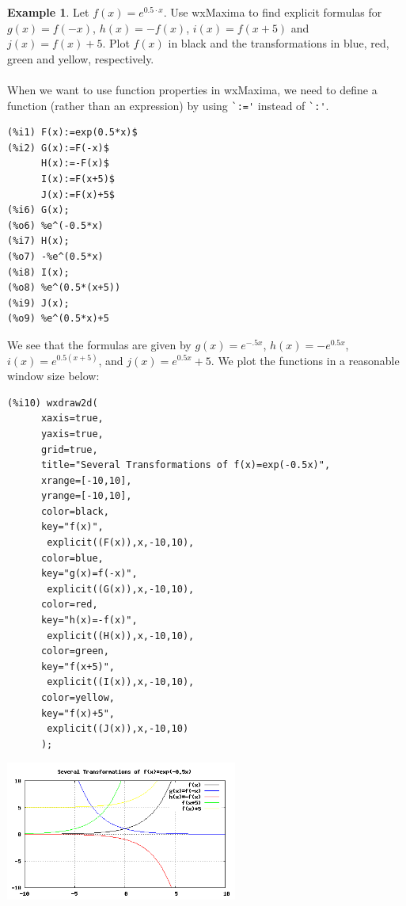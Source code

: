 \documentclass[10.5pt,twoside]{report}
\theoremstyle{definition}
\newtheorem{exmp}{Example}[section]
\begin{document}
\begin{exmp}
Let $f(x)=e^{0.5\cdot x}$.  Use wxMaxima to find explicit formulas for $g(x)=f(-x)$, $h(x)=-f(x)$, $i(x)=f(x+5)$ and $j(x)=f(x)+5$.  Plot $f(x)$ in black and the transformations in blue, red, green and yellow, respectively.\\
${}$\\

When we want to use function properties in wxMaxima, we need to define a function (rather than an expression) by using \verb|`:='| instead of \verb|`:'|.\\

\begin{verbatim}
(%i1) F(x):=exp(0.5*x)$
(%i2) G(x):=F(-x)$
      H(x):=-F(x)$
      I(x):=F(x+5)$
      J(x):=F(x)+5$
(%i6) G(x);
(%o6) %e^(-0.5*x)
(%i7) H(x);
(%o7) -%e^(0.5*x)
(%i8) I(x);
(%o8) %e^(0.5*(x+5))
(%i9) J(x);
(%o9) %e^(0.5*x)+5
\end{verbatim}

We see that the formulas are given by $g(x)=e^{-.5x}$, $h(x)=-e^{0.5x}$, $i(x)=e^{0.5(x+5)}$, and $j(x)=e^{0.5x}+5$.  We plot the functions in a reasonable window size below:\\

\begin{verbatim}
(%i10) wxdraw2d(
      xaxis=true,
      yaxis=true,
      grid=true,
      title="Several Transformations of f(x)=exp(-0.5x)",
      xrange=[-10,10],
      yrange=[-10,10],
      color=black,
      key="f(x)",
       explicit((F(x)),x,-10,10),
      color=blue,
      key="g(x)=f(-x)",
       explicit((G(x)),x,-10,10),
      color=red,
      key="h(x)=-f(x)",
       explicit((H(x)),x,-10,10),
      color=green,
      key="f(x+5)",
       explicit((I(x)),x,-10,10),
      color=yellow,
      key="f(x)+5",
       explicit((J(x)),x,-10,10)
      );
\end{verbatim}

\includegraphics[width=3in]{example_1_4_1}

\end{exmp}
\end{document}

